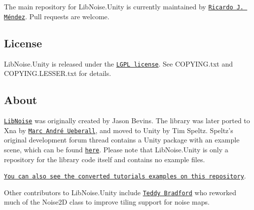The main repository for Lib\+Noise.\+Unity is currently maintained by \href{https://github.com/ricardojmendez}{\tt Ricardo J. Méndez}. Pull requests are welcome.

\subsection*{License}

Lib\+Noise.\+Unity is released under the \href{https://www.gnu.org/licenses/lgpl.html}{\tt L\+G\+PL license}. See C\+O\+P\+Y\+I\+N\+G.\+txt and C\+O\+P\+Y\+I\+N\+G.\+L\+E\+S\+S\+E\+R.\+txt for details.

\subsection*{About}

\href{http://libnoise.sourceforge.net/}{\tt Lib\+Noise} was originally created by Jason Bevins. The library was later ported to Xna by \href{http://www.big-black-block.com/#home}{\tt Marc André Ueberall}, and moved to Unity by Tim Speltz. Speltz’s original development forum thread contains a Unity package with an example scene, which can be found \href{http://forum.unity3d.com/threads/68764-LibNoise-Ported-to-Unity}{\tt here}. Please note that Lib\+Noise.\+Unity is only a repository for the library code itself and contains no example files.

\href{https://github.com/ricardojmendez/LibNoiseTutorials}{\tt You can also see the converted tutorials examples on this repository}.

Other contributors to Lib\+Noise.\+Unity include \href{https://github.com/teddybradford}{\tt Teddy Bradford} who reworked much of the Noise2D class to improve tiling support for noise maps. 
